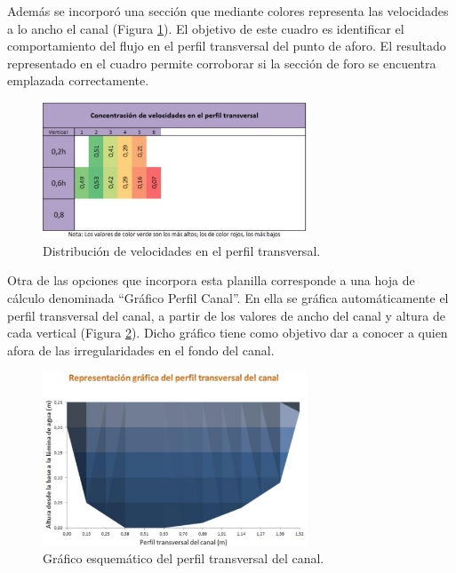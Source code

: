 \documentclass[]{article}
\begin{document}
Además se incorporó una sección que mediante colores representa las velocidades a lo ancho el canal (Figura \ref{dist_veloc}). El objetivo de este cuadro es identificar el comportamiento del flujo en el perfil transversal del punto de aforo. El resultado representado en el cuadro permite corroborar si la sección de foro se encuentra emplazada correctamente. 

\begin{figure}[H]
\centering
\includegraphics[width=0.7\textwidth]{images/perfil_tran.eps}
\caption{Distribución de velocidades en el perfil transversal.}
\label{dist_veloc}
\end{figure}

Otra de las opciones que incorpora esta planilla corresponde  a una hoja de cálculo denominada “Gráfico Perfil Canal”. En ella se gráfica automáticamente el perfil transversal del canal, a partir de los valores de ancho del canal y altura de cada vertical (Figura \ref{graf_esq}). Dicho gráfico tiene como objetivo dar a conocer a quien afora de las irregularidades en el fondo del canal.

\begin{figure}[H]
\centering
\includegraphics[width=0.7\textwidth]{images/grafico_esquematico.eps}
\caption{Gráfico esquemático del perfil transversal del canal.}
\label{graf_esq}
\end{figure}
\end{document}

